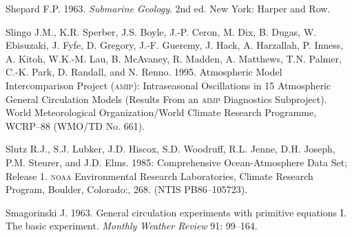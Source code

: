 \begin{thebibliography}{999}
Shepard F.P.  1963. \textit{Submarine Geology}. 2nd ed. New York:
Harper and Row.
%

Slingo J.M., K.R. Sperber, J.S. Boyle, J.-P. Ceron, M. Dix, B. Dugas,
W. Ebisuzaki, J. Fyfe, D. Gregory, J.-F. Gueremy, J. Hack,
A. Harzallah, P. Inness, A. Kitoh, W.K.-M. Lau, B. McAvaney,
R. Madden, A. Matthews, T.N. Palmer, C.-K. Park, D. Randall, and
N. Renno. 1995. Atmospheric Model Intercomparison Project
(\textsc{amip}): Intraseasonal Oscillations in 15 Atmospheric General
Circulation Models (Results From an \textsc{aimp} Diagnostics
Subproject). World Meteorological Organization/World Climate Research
Programme, WCRP--88 (WMO/TD No. 661).
%

Slutz R.J., S.J. Lubker, J.D. Hiscox, S.D. Woodruff, R.L. Jenne,
D.H. Joseph, P.M. Steurer, and J.D. Elms. 1985: Comprehensive
Ocean-Atmosphere Data Set; Release 1. \textsc{noaa} Environmental
Research Laboratories, Climate Research Program, Boulder, Colorado:,
268. (NTIS PB86--105723).
%

Smagorinski J.  1963. General circulation experiments with primitive
equations I. The basic experiment. \textit{Monthly Weather Review} 91:
99--164.
%


\end{thebibliography}
